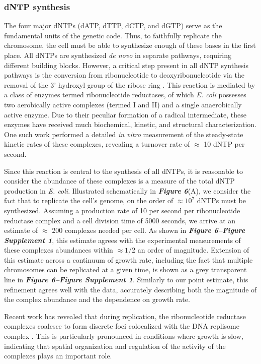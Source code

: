 \subsubsection{dNTP synthesis}
The four major dNTPs (dATP, dTTP, dCTP, and dGTP) serve as the fundamental
units of the genetic code. Thus, to faithfully replicate the chromosome, the
cell must be able to synthesize enough of these bases in the first place. All
dNTPs are synthesized \textit{de novo} in separate pathways, requiring
different building blocks. However, a critical step present in all dNTP
synthesis pathways is the conversion from ribonucleotide to
deoxyribonucleotide via the removal of the 3' hydroxyl group of the ribose
ring \citep{rudd2016}. This reaction is mediated by a class of enzymes termed
ribonucleotide reductases, of which \textit{E. coli} possesses two
aerobically active complexes (termed I and II) and a single anaerobically
active enzyme. Due to their peculiar formation of a radical intermediate,
these enzymes have received much biochemical, kinetic, and structural
characterization. One such work \citep{ge2003} performed a detailed
\textit{in vitro} measurement of the steady-state kinetic rates of these
complexes, revealing a turnover rate of $\approx$ 10 dNTP per second.

Since this reaction is central to the synthesis of all dNTPs, it is
reasonable to consider the abundance of these complexes is a measure of the
total dNTP production in \textit{E. coli}. Illustrated schematically in
\textbf{\textit{Figure 6}}(A), we consider the fact that to replicate the cell's
genome, on the order of $\approx 10^7$ dNTPs must be synthesized. Assuming a
production rate of 10 per second per ribonucleotide reductase complex and a
cell division time of 5000 seconds, we arrive at an estimate of $\approx$ 200
complexes needed per cell. As shown in \textbf{\textit{Figure 6–Figure Supplement 1}}, this estimate agrees with the experimental measurements of these
complexes abundances within $\approx 1/2$ an order of magnitude. Extension of
this estimate across a continuum of growth rate, including the fact that
multiple chromosomes can be replicated at a given time, is shown as a grey
transparent line in \textbf{\textit{Figure 6–Figure Supplement 1}}. Similarly to our point estimate, this
refinement agrees well with the data, accurately describing both the
magnitude of the complex abundance and the dependence on growth rate.

Recent work has revealed that during replication, the ribonucleotide
reductase complexes coalesce to form discrete foci colocalized with the DNA
replisome complex \citep{sanchez-romero2011}. This is particularly pronounced
in conditions where growth is slow, indicating that spatial organization and
regulation of the activity of the complexes plays an important role.

